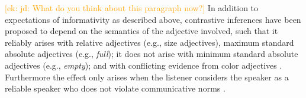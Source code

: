 \documentclass[10pt,letterpaper]{article}
\newcommand{\ek}[1]{\textcolor{Orange}{[ek: #1]}}
\newcommand{\jd}[1]{\textcolor{Purple}{[jd: #1]}}
\begin{document}
\ek{jd: What do you think about this paragraph now?}
In addition to expectations of informativity as described above, contrastive inferences have been proposed to depend on the semantics of the adjective involved, such that it reliably arises with relative adjectives (e.g., size adjectives), maximum standard absolute adjectives (e.g., \textit{full}); it does not arise with minimum standard absolute adjectives (e.g., \textit{empty}); and with conflicting evidence from color adjectives \cite{Aparicio:2018,Sedivy:2003}. Furthermore the effect only arises when the listener considers the speaker as a reliable speaker who does not violate communicative norms \cite{Grodner:2011,Ryskin:2019}.
\end{document}
